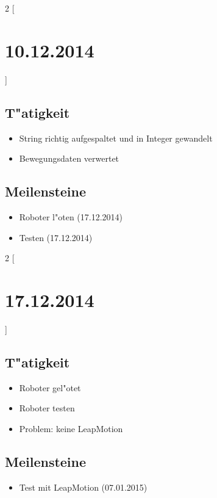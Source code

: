 \documentclass[11pt,a4paper]{article}
\begin{document}
\begin{multicols}{2}
[\section*{  10.12.2014  }] 


\subsection*{T"atigkeit}
\begin{itemize}
\item String richtig aufgespaltet und in Integer gewandelt
\item Bewegungsdaten verwertet
\end{itemize}

\columnbreak

\subsection*{Meilensteine}

\begin{itemize}
\item Roboter l"oten (17.12.2014)
\item Testen (17.12.2014)
\end{itemize}

\end{multicols}


\begin{multicols}{2}
[\section*{  17.12.2014  }] 


\subsection*{T"atigkeit}
\begin{itemize}
\item Roboter gel"otet
\item Roboter testen
\item Problem: keine LeapMotion
\end{itemize}

\columnbreak

\subsection*{Meilensteine}

\begin{itemize}
\item Test mit LeapMotion (07.01.2015)
\end{itemize}

\end{multicols}
\end{document}
